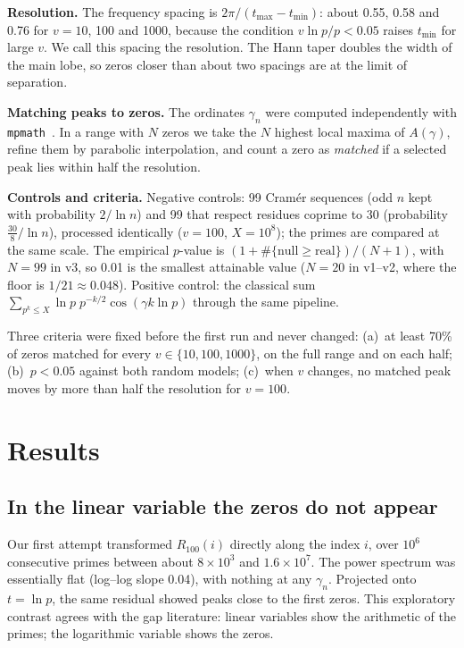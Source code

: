 \documentclass[11pt,a4paper]{article}
\newcommand{\para}[1]{\textsf{\bfseries #1}\hspace{0.45em}}
\begin{document}
\para{Resolution.} The frequency spacing is $2\pi/(t_{\max}-t_{\min})$: about 0.55, 0.58 and 0.76 for $v=10$, 100 and 1000, because the condition $v\ln p/p<0.05$ raises $t_{\min}$ for large $v$. We call this spacing the resolution. The Hann taper doubles the width of the main lobe, so zeros closer than about two spacings are at the limit of separation.

\para{Matching peaks to zeros.} The ordinates $\gamma_n$ were computed independently with \texttt{mpmath}~\cite{mpmath}. In a range with $N$ zeros we take the $N$ highest local maxima of $A(\gamma)$, refine them by parabolic interpolation, and count a zero as \emph{matched} if a selected peak lies within half the resolution.

\para{Controls and criteria.} Negative controls: 99 Cramér sequences (odd $n$ kept with probability $2/\ln n$) and 99 that respect residues coprime to 30 (probability $\tfrac{30}{8}/\ln n$), processed identically ($v=100$, $X=10^8$); the primes are compared at the same scale. The empirical $p$-value is $(1+\#\{\text{null}\ge\text{real}\})/(N+1)$, with $N=99$ in v3, so 0.01 is the smallest attainable value ($N=20$ in v1--v2, where the floor is $1/21\approx0.048$). Positive control: the classical sum $\sum_{p^k\le X}\ln p\;p^{-k/2}\cos(\gamma k\ln p)$ through the same pipeline.

Three criteria were fixed before the first run and never changed: (a)~at least 70\% of zeros matched for every $v\in\{10,100,1000\}$, on the full range and on each half; (b)~$p<0.05$ against both random models; (c)~when $v$ changes, no matched peak moves by more than half the resolution for $v=100$.

\clearpage
\section{Results}

\subsection{In the linear variable the zeros do not appear}

Our first attempt transformed $R_{100}(i)$ directly along the index $i$, over $10^6$ consecutive primes between about $8\times10^3$ and $1.6\times10^7$. The power spectrum was essentially flat (log--log slope 0.04), with nothing at any $\gamma_n$. Projected onto $t=\ln p$, the same residual showed peaks close to the first zeros. This exploratory contrast agrees with the gap literature: linear variables show the arithmetic of the primes; the logarithmic variable shows the zeros.
\end{document}
